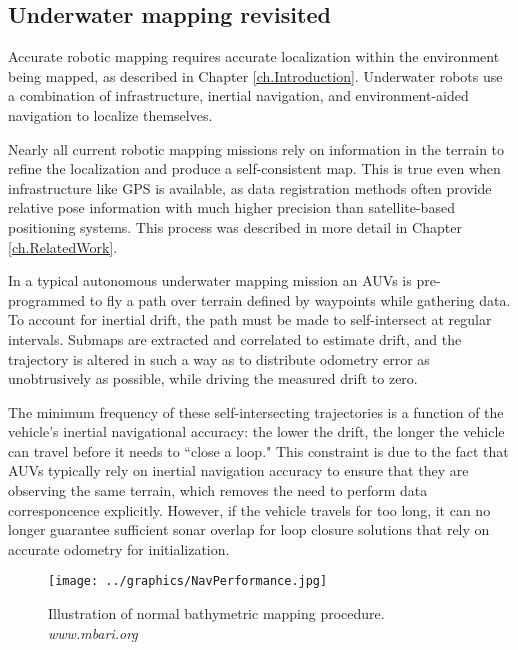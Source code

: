 \subsection{Underwater mapping revisited}

Accurate robotic mapping requires accurate localization within the environment being mapped, as described in Chapter \ref{ch.Introduction}. Underwater robots use a combination of infrastructure, inertial navigation, and environment-aided navigation to localize themselves. 

Nearly all current robotic mapping missions rely on information in the terrain to refine the localization and produce a self-consistent map. This is true even when infrastructure like GPS is available, as data registration methods often provide relative pose information with much higher precision than satellite-based positioning systems. This process was described in more detail in Chapter \ref{ch.RelatedWork}.

In a typical autonomous underwater mapping mission an AUVs is pre-programmed to fly a path over terrain defined by waypoints while gathering data. To account for inertial drift, the path must be made to self-intersect at regular intervals. Submaps are extracted and correlated to estimate drift, and the trajectory is altered in such a way as to distribute odometry error as unobtrusively as possible, while driving the measured drift to zero. 

The minimum frequency of these self-intersecting trajectories is a function of the vehicle's inertial navigational accuracy: the lower the drift, the longer the vehicle can travel before it needs to ``close a loop." This constraint is due to the fact that AUVs typically rely on inertial navigation accuracy to ensure that they are observing the same terrain, which removes the need to perform data corresponcence explicitly. However, if the vehicle travels for too long, it can no longer guarantee sufficient sonar overlap for loop closure solutions that rely on accurate odometry for initialization. 

 \begin{figure}[htb]
   \centering
   \texttt{[image: ../graphics/NavPerformance.jpg]} %
   \caption{Illustration of normal bathymetric mapping procedure. \emph{www.mbari.org} }
   \label{fig:BathyMapping2}
\end{figure}




